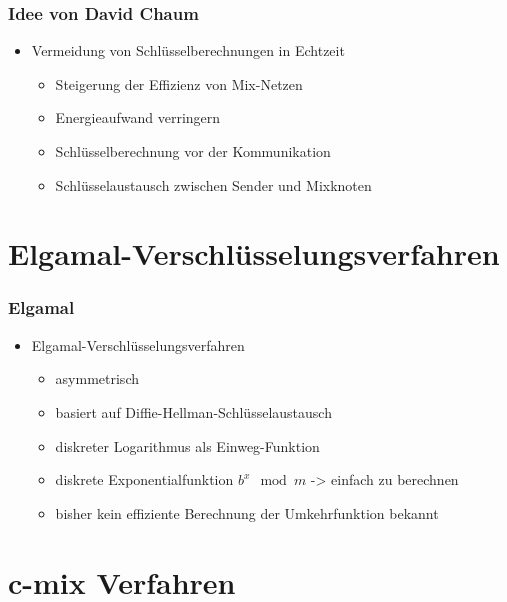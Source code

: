 \documentclass[t, xcolor=dvipsnames]{beamer}
\begin{document}
\begin{frame}
	\frametitle{Idee von David Chaum}
	\begin{itemize}
		\item Vermeidung von Schlüsselberechnungen in Echtzeit 
			\begin{itemize}
				\item Steigerung der Effizienz von Mix-Netzen
				\item Energieaufwand verringern
				\item Schlüsselberechnung vor der Kommunikation
				\item Schlüsselaustausch zwischen Sender und Mixknoten
			\end{itemize}
	\end{itemize}
	\vspace{\fill}
\end{frame}

\section{Elgamal-Verschlüsselungsverfahren}
\begin{frame}
	\frametitle{Elgamal}
	\begin{itemize}
		\item Elgamal-Verschlüsselungsverfahren
			\begin{itemize}
				\item asymmetrisch
				\item basiert auf Diffie-Hellman-Schlüsselaustausch
				\item diskreter Logarithmus als Einweg-Funktion
				\item diskrete Exponentialfunktion $b^x \mod m$ -> einfach zu berechnen
				\item bisher kein effiziente Berechnung der Umkehrfunktion bekannt
			\end{itemize}
	\end{itemize}
	\vspace{\fill}
\end{frame}

\section{c-mix Verfahren} %
\end{document}
